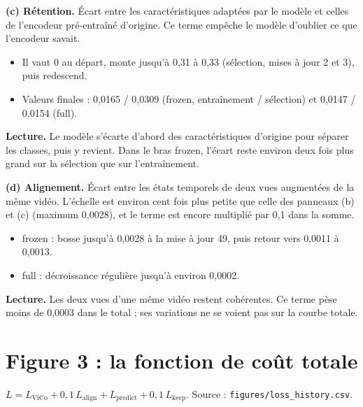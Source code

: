 \documentclass[11pt,a4paper]{article}
\newcommand{\lecture}[1]{\textbf{Lecture.} #1}
\newcommand{\quatre}[1]{%
  \addplot[frozen,thick] table[x=update,y=#1]{frozen_train.dat};
  \addplot[frozen,thick,densely dashed] table[x=update,y=#1]{frozen_selection.dat};
  \addplot[full,thick] table[x=update,y=#1]{full_train.dat};
  \addplot[full,thick,densely dashed] table[x=update,y=#1]{full_selection.dat};}
\begin{document}
\textbf{(c) Rétention.} Écart entre les caractéristiques adaptées par le modèle et celles de
l'encodeur pré-entraîné d'origine. Ce terme empêche le modèle d'oublier ce que l'encodeur savait.
\begin{itemize}\itemsep1pt
\item Il vaut 0 au départ, monte jusqu'à 0,31 à 0,33 (sélection, mises à jour 2 et 3), puis redescend.
\item Valeurs finales : 0,0165 / 0,0309 (frozen, entraînement / sélection) et 0,0147 / 0,0154 (full).
\end{itemize}
\lecture{Le modèle s'écarte d'abord des caractéristiques d'origine pour séparer les classes, puis
y revient. Dans le bras frozen, l'écart reste environ deux fois plus grand sur la sélection que sur
l'entraînement.}

\textbf{(d) Alignement.} Écart entre les états temporels de deux vues augmentées de la même vidéo.
L'échelle est environ cent fois plus petite que celle des panneaux (b) et (c) (maximum 0,0028), et le terme est
encore multiplié par 0,1 dans la somme.
\begin{itemize}\itemsep1pt
\item \textcolor{frozen}{frozen} : bosse jusqu'à 0,0028 à la mise à jour 49, puis retour vers 0,0011 à 0,0013.
\item \textcolor{full}{full} : décroissance régulière jusqu'à environ 0,0002.
\end{itemize}
\lecture{Les deux vues d'une même vidéo restent cohérentes. Ce terme pèse moins de 0,0003 dans le
total ; ses variations ne se voient pas sur la courbe totale.}

\newpage
\section*{Figure 3 : la fonction de coût totale}

\begin{center}
\end{center}
{\footnotesize $L = L_{\text{ViCo}} + 0{,}1\,L_{\text{align}} + L_{\text{predict}} + 0{,}1\,L_{\text{keep}}$.
Source : \texttt{figures/loss\_history.csv}.}
\end{document}
